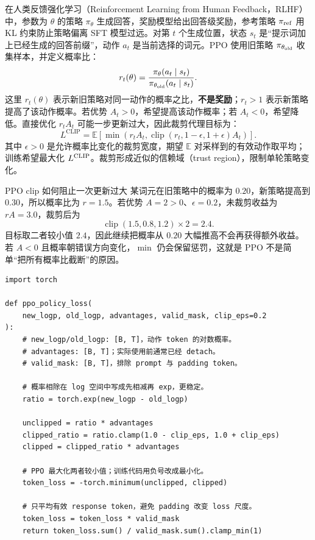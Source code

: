 在人类反馈强化学习（Reinforcement Learning from Human Feedback，RLHF）中，参数为 $\theta$ 的策略 $\pi_\theta$ 生成回答，奖励模型给出回答级奖励，参考策略 $\pi_{\rm ref}$ 用 KL 约束防止策略偏离 SFT 模型过远。对第 $t$ 个生成位置，状态 $s_t$ 是“提示词加上已经生成的回答前缀”，动作 $a_t$ 是当前选择的词元。PPO 使用旧策略 $\pi_{\theta_{\rm old}}$ 收集样本，并定义概率比：
\[
r_t(\theta)=
\frac{\pi_\theta(a_t\mid s_t)}
{\pi_{\theta_{\rm old}}(a_t\mid s_t)}.
\]
这里 $r_t(\theta)$ 表示新旧策略对同一动作的概率之比，\textbf{不是奖励}；$r_t>1$ 表示新策略提高了该动作概率。若优势 $A_t>0$，希望提高该动作概率；若 $A_t<0$，希望降低。直接优化 $r_tA_t$ 可能一步更新过大，因此裁剪代理目标为：
\[
L^{\mathrm{CLIP}}=
\mathbb E\left[
\min\left(
r_tA_t,
\operatorname{clip}(r_t,1-\epsilon,1+\epsilon)A_t
\right)
\right].
\]
其中 $\epsilon>0$ 是允许概率比变化的裁剪宽度，期望 $\mathbb E$ 对采样到的有效动作取平均；训练希望最大化 $L^{\rm CLIP}$。裁剪形成近似的信赖域（trust region），限制单轮策略变化。

\begin{examplebox}{PPO clip 如何阻止一次更新过大}
某词元在旧策略中的概率为 $0.20$，新策略提高到 $0.30$，所以概率比为 $r=1.5$。若优势 $A=2>0$、$\epsilon=0.2$，未裁剪收益为 $rA=3.0$，裁剪后为
\[
\operatorname{clip}(1.5,0.8,1.2)\times2=2.4.
\]
目标取二者较小值 $2.4$，因此继续把概率从 $0.20$ 大幅推高不会再获得额外收益。若 $A<0$ 且概率朝错误方向变化，$\min$ 仍会保留惩罚，这就是 PPO 不是简单“把所有概率比截断”的原因。
\end{examplebox}


\begin{lstlisting}
import torch

def ppo_policy_loss(
    new_logp, old_logp, advantages, valid_mask, clip_eps=0.2
):
    # new_logp/old_logp: [B, T]，动作 token 的对数概率。
    # advantages: [B, T]；实际使用前通常已经 detach。
    # valid_mask: [B, T]，排除 prompt 与 padding token。

    # 概率相除在 log 空间中写成先相减再 exp，更稳定。
    ratio = torch.exp(new_logp - old_logp)

    unclipped = ratio * advantages
    clipped_ratio = ratio.clamp(1.0 - clip_eps, 1.0 + clip_eps)
    clipped = clipped_ratio * advantages

    # PPO 最大化两者较小值；训练代码用负号改成最小化。
    token_loss = -torch.minimum(unclipped, clipped)

    # 只平均有效 response token，避免 padding 改变 loss 尺度。
    token_loss = token_loss * valid_mask
    return token_loss.sum() / valid_mask.sum().clamp_min(1)
\end{lstlisting}

